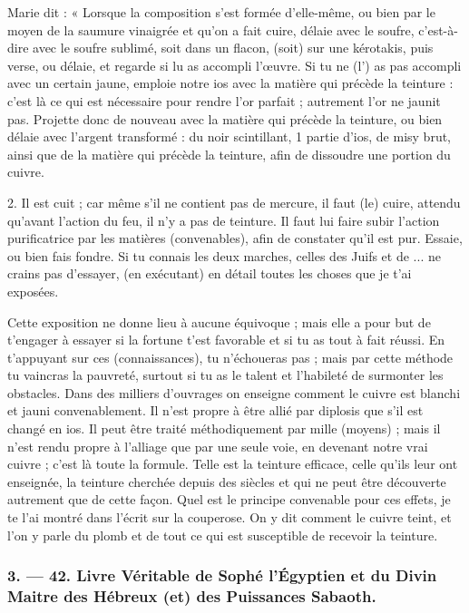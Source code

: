 \documentclass[a4paper, 11pt, oneside, polutonikogreek, french]{article}
\begin{document}
Marie dit : « Lorsque la composition s'est formée d'elle-même, ou bien par le moyen de la saumure vinaigrée et qu'on a fait cuire, délaie avec le soufre, c'est-à-dire avec le soufre sublimé, soit dans un flacon, (soit) sur une kérotakis, puis verse, ou délaie, et regarde si lu as accompli l'œuvre. Si tu ne (l') as pas accompli avec un certain jaune, emploie notre ios avec la matière qui précède la teinture : c'est là ce qui est nécessaire pour rendre l'or parfait ; autrement l'or ne jaunit pas. Projette donc de nouveau avec la matière qui précède la teinture, ou bien délaie avec l'argent transformé : du noir scintillant, 1 partie d'ios, de misy brut, ainsi que de la matière qui précède la teinture, afin de dissoudre une portion du cuivre.

2. Il est cuit ; car même s'il ne contient pas de mercure, il faut (le) cuire, attendu qu'avant l'action du feu, il n'y a pas de teinture. Il faut lui faire subir l'action purificatrice par les matières (convenables), afin de constater qu'il est pur. Essaie, ou bien fais fondre. Si tu connais les deux marches, celles des Juifs et de ... ne crains pas d'essayer, (en exécutant) en détail toutes les choses que je t'ai exposées.

Cette exposition ne donne lieu à aucune équivoque ; mais elle a pour but de t'engager à essayer si la fortune t'est favorable et si tu as tout à fait réussi. En t'appuyant sur ces (connaissances), tu n'échoueras pas ; mais par cette méthode tu vaincras la pauvreté, surtout si tu as le talent et l'habileté de surmonter les obstacles. Dans des milliers d'ouvrages on enseigne comment le cuivre est blanchi et jauni convenablement. Il n'est propre à être allié par diplosis que s'il est changé en ios. Il peut être traité méthodiquement par mille (moyens) ; mais il n'est rendu propre à l'alliage que par une seule voie, en devenant notre vrai cuivre ; c'est là toute la formule. Telle est la teinture efficace, celle qu'ils leur ont enseignée, la teinture cherchée depuis des siècles et qui ne peut être découverte autrement que de cette façon. Quel est le principe convenable pour ces effets, je te l'ai montré dans l'écrit sur la couperose. On y dit comment le cuivre teint, et l'on y parle du plomb et de tout ce qui est susceptible de recevoir la teinture.

\bigskip
\centerline{\EightStarTaper}
\centerline{\EightStarTaper\EightStarTaper}
\bigskip

\subsubsection{3. --- 42. Livre Véritable de Sophé l'Égyptien et du Divin Maitre des Hébreux (et) des Puissances Sabaoth.}
\end{document}
